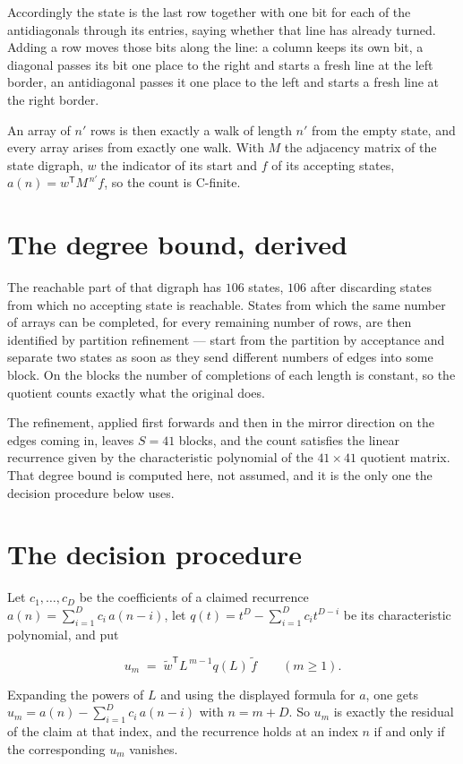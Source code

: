 \documentclass[11pt]{article}
\theoremstyle{definition}
\begin{document}
Accordingly the state is the last row together with one bit for each of the antidiagonals through its entries, saying whether that line has already turned. Adding a row moves those bits along the line: a column keeps its own bit, a diagonal passes its bit one place to the right and starts a fresh line at the left border, an antidiagonal passes it one place to the left and starts a fresh line at the right border.

An array of $n'$ rows is then exactly a walk of length $n'$ from the empty state, and every array arises from exactly one walk. With $M$ the adjacency matrix of the state digraph, $w$ the indicator of its start and $f$ of its accepting states, $a(n) = w^{\mathsf T}M^{\,n'}f$, so the count is C-finite.

\section{The degree bound, derived}

The reachable part of that digraph has $106$ states, $106$ after discarding states from which no accepting state is reachable. States from which the same number of arrays can be completed, for every remaining number of rows, are then identified by partition refinement --- start from the partition by acceptance and separate two states as soon as they send different numbers of edges into some block. On the blocks the number of completions of each length is constant, so the quotient counts exactly what the original does.

The refinement, applied first forwards and then in the mirror direction on the edges coming in, leaves $S = 41$ blocks, and the count satisfies the linear recurrence given by the characteristic polynomial of the $41 \times 41$ quotient matrix. That degree bound is computed here, not assumed, and it is the only one the decision procedure below uses.

\section{The decision procedure}

Let $c_1,\dots,c_D$ be the coefficients of a claimed recurrence $a(n) = \sum_{i=1}^{D} c_i\,a(n-i)$, let $q(t) = t^{D} - \sum_{i=1}^{D} c_i t^{D-i}$ be its characteristic polynomial, and put

\[u_m \;=\; \tilde w^{\mathsf T} L^{\,m-1} q(L)\,\tilde f \qquad (m \ge 1).\]

Expanding the powers of $L$ and using the displayed formula for $a$, one gets $u_m = a(n) - \sum_{i=1}^{D} c_i\,a(n-i)$ with $n = m + D$. So $u_m$ is exactly the residual of the claim at that index, and the recurrence holds at an index $n$ if and only if the corresponding $u_m$ vanishes.
\end{document}
